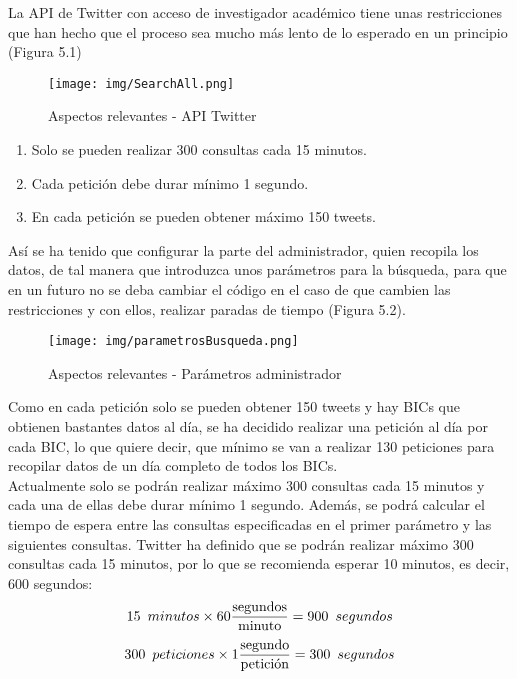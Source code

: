 La API de Twitter con acceso de investigador académico tiene unas restricciones que han hecho que el proceso sea mucho más lento de lo esperado en un principio (Figura 5.1)\\
\begin{figure}[h!]
    \centering
    \texttt{[image: img/SearchAll.png]} \\
    \caption{Aspectos relevantes - API Twitter}
    \label{Aspectos relevantes - API Twitter}
\end{figure}
\begin{enumerate}
    \item Solo se pueden realizar 300 consultas cada 15 minutos.
    \item Cada petición debe durar mínimo 1 segundo.
    \item En cada petición se pueden obtener máximo 150 tweets.
\end{enumerate}
Así se ha tenido que configurar la parte del administrador, quien recopila los datos, de tal manera que introduzca unos parámetros para la búsqueda, para que en un futuro no se deba cambiar el código en el caso de que cambien las restricciones y con ellos, realizar paradas de tiempo (Figura 5.2).\\
\begin{figure}[h!]
    \centering
    \texttt{[image: img/parametrosBusqueda.png]} \\
    \caption{Aspectos relevantes - Parámetros administrador}
    \label{Aspectos relevantes - Parametros administrador}
\end{figure}
Como en cada petición solo se pueden obtener 150 tweets y hay BICs que obtienen bastantes datos al día, se ha decidido realizar una petición al día por cada BIC, lo que quiere decir, que mínimo se van a realizar 130 peticiones para recopilar datos de un día completo de todos los BICs.\\
Actualmente solo se podrán realizar máximo 300 consultas cada 15 minutos y cada una de ellas debe durar mínimo 1 segundo. Además, se podrá calcular el tiempo de espera entre las consultas especificadas en el primer parámetro y las siguientes consultas. Twitter ha definido que se podrán realizar máximo 300 consultas cada 15 minutos, por lo que se recomienda esperar 10 minutos, es decir, 600 segundos:\\
    $$ 15\hspace{0.5em}minutos\times60\frac{\text{segundos}}{\text{minuto}}=900\hspace{0.5em}segundos $$
    $$ 300\hspace{0.5em}peticiones\times1\frac{\text{segundo}}{\text{petición}}=300\hspace{0.5em}segundos $$
